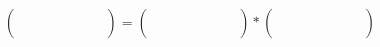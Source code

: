 \begin{align*}
	\begin{pmatrix}
		& & & & & & & \\	
		& & & & & & & \\	
		& & & & & & & \\	
		& & & & & & & \\
		& & & & & & &
	\end{pmatrix}
	=
		\begin{pmatrix}
	& & & & & & & \\	
	& & & & & & & \\	
	& & & & & & & \\
	& & & & & & & \\	
	& & & & & & &
	\end{pmatrix} 
	* 
		\begin{pmatrix}
	& & & & & & & \\	
	& & & & & & & \\	
	& & & & & & & \\
	& & & & & & & \\	
	& & & & & & &
	\end{pmatrix}
\end{align*}

\vspace{-2.6cm}
\hspace{2cm}
